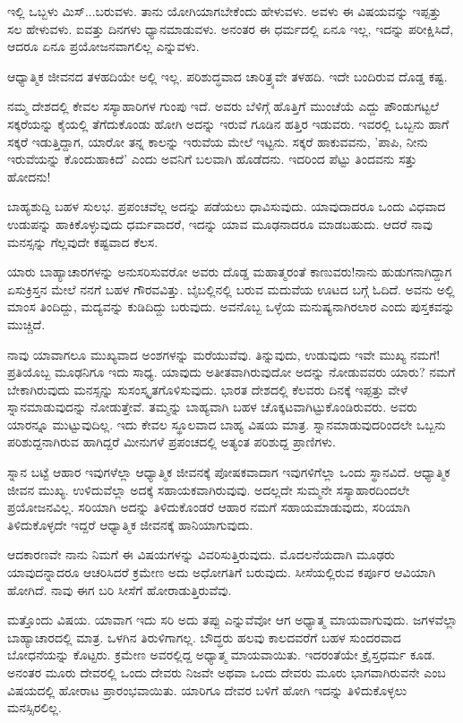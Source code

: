 ಇಲ್ಲಿ ಒಬ್ಬಳು ಮಿಸ್...ಬರುವಳು. ತಾನು ಯೋಗಿಯಾಗಬೇಕೆಂದು ಹೇಳುವಳು. ಅವಳು ಈ ವಿಷಯವನ್ನು ಇಪ್ಪತ್ತು ಸಲ ಹೇಳುವಳು. ಐವತ್ತು ದಿನಗಳು ಧ್ಯಾನಮಾಡುವಳು. ಅನಂತರ ಈ ಧರ್ಮದಲ್ಲಿ ಏನೂ ಇಲ್ಲ, ಇದನ್ನು ಪರೀಕ್ಷಿಸಿದೆ, ಆದರೂ ಏನೂ ಪ್ರಯೋಜನವಾಗಲಿಲ್ಲ ಎನ್ನುವಳು.

ಆಧ್ಯಾತ್ಮಿಕ ಜೀವನದ ತಳಹದಿಯೇ ಅಲ್ಲಿ ಇಲ್ಲ. ಪರಿಶುದ್ಧವಾದ ಚಾರಿತ್ರ್ಯವೇ ತಳಹದಿ. ಇದೇ ಬಂದಿರುವ ದೊಡ್ಡ ಕಷ್ಟ.

ನಮ್ಮ ದೇಶದಲ್ಲಿ ಕೇವಲ ಸಸ್ಯಾಹಾರಿಗಳ ಗುಂಪು ಇದೆ. ಅವರು ಬೆಳಿಗ್ಗೆ ಹೊತ್ತಿಗೆ ಮುಂಚೆಯೆ ಎದ್ದು ಪೌಂಡುಗಟ್ಟಲೆ ಸಕ್ಕರೆಯನ್ನು ಕೈಯಲ್ಲಿ ತೆಗೆದುಕೊಂಡು ಹೋಗಿ ಅದನ್ನು ಇರುವೆ ಗೂಡಿನ ಹತ್ತಿರ ಇಡುವರು. ಇವರಲ್ಲಿ ಒಬ್ಬನು ಹಾಗೆ ಸಕ್ಕರೆ ಇಡುತ್ತಿದ್ದಾಗ, ಯಾರೋ ತನ್ನ ಕಾಲನ್ನು ಇರುವೆಯ ಮೇಲೆ ಇಟ್ಟನು. ಸಕ್ಕರೆ ಹಾಕುವವನು, 'ಪಾಪಿ, ನೀನು ಇರುವೆಯನ್ನು ಕೊಂದುಹಾಕಿದೆ' ಎಂದು ಅವನಿಗೆ ಬಲವಾಗಿ ಹೊಡೆದನು. ಇದರಿಂದ ಪೆಟ್ಟು ತಿಂದವನು ಸತ್ತು ಹೋದನು!

ಬಾಹ್ಯಶುದ್ದಿ ಬಹಳ ಸುಲಭ. ಪ್ರಪಂಚವೆಲ್ಲ ಅದನ್ನು ಪಡೆಯಲು ಧಾವಿಸುವುದು. ಯಾವುದಾದರೂ ಒಂದು ವಿಧವಾದ ಉಡುಪನ್ನು ಹಾಕಿಕೊಳ್ಳುವುದು ಧರ್ಮವಾದರೆ, ಇದನ್ನು ಯಾವ ಮೂಢನಾದರೂ ಮಾಡಬಹುದು. ಆದರೆ ನಾವು ಮನಸ್ಸನ್ನು ಗೆಲ್ಲವುದೇ ಕಷ್ಟವಾದ ಕೆಲಸ.

ಯಾರು ಬಾಹ್ಯಾಚಾರಗಳನ್ನು ಅನುಸರಿಸುವರೋ ಅವರು ದೊಡ್ಡ ಮಹಾತ್ಮರಂತೆ ಕಾಣುವರು!ನಾನು ಹುಡುಗನಾಗಿದ್ದಾಗ ಏಸುಕ್ರಿಸ್ತನ ಮೇಲೆ ನನಗೆ ಬಹಳ ಗೌರವವಿತ್ತು. ಬೈಬಲ್ಲಿನಲ್ಲಿ ಬರುವ ಮದುವೆಯ ಊಟದ ಬಗ್ಗೆ ಓದಿದೆ. ಅವನು ಅಲ್ಲಿ ಮಾಂಸ ತಿಂದಿದ್ದು, ಮದ್ಯವನ್ನು ಕುಡಿದಿದ್ದು ಬರುವುದು. ಅವನೊಬ್ಬ ಒಳ್ಳೆಯ ಮನುಷ್ಯನಾಗಿರಲಾರ ಎಂದು ಪುಸ್ತಕವನ್ನು ಮುಚ್ಚಿದೆ.

ನಾವು ಯಾವಾಗಲೂ ಮುಖ್ಯವಾದ ಅಂಶಗಳನ್ನು ಮರೆಯುವೆವು. ತಿನ್ನುವುದು, ಉಡುವುದು ಇವೇ ಮುಖ್ಯ ನಮಗೆ! ಪ್ರತಿಯೊಬ್ಬ ಮೂಢನಿಗೂ ಇದು ಸಾಧ್ಯ. ಯಾವುದು ಅತೀತವಾಗಿರುವುದೋ ಅದನ್ನು ನೋಡುವವರು ಯಾರು? ನಮಗೆ ಬೇಕಾಗಿರುವುದು ಮನಸ್ಸನ್ನು ಸುಸಂಸ್ಕೃತಗೊಳಿಸುವುದು. ಭಾರತ ದೇಶದಲ್ಲಿ ಕೆಲವರು ದಿನಕ್ಕೆ ಇಪ್ಪತ್ತು ವೇಳೆ ಸ್ನಾನಮಾಡುವುದನ್ನು ನೋಡುತ್ತೇವೆ. ತಮ್ಮನ್ನು ಬಾಹ್ಯವಾಗಿ ಬಹಳ ಚೊಕ್ಕಟವಾಗಿಟ್ಟುಕೊಂಡಿರುವರು. ಅವರು ಯಾರನ್ನೂ ಮುಟ್ಟುವುದಿಲ್ಲ. ಇದು ಕೇವಲ ಸ್ಥೂಲವಾದ ಬಾಹ್ಯ ವಿಷಯ ಮಾತ್ರ. ಸ್ನಾನಮಾಡುವುದರಿಂದಲೇ ಒಬ್ಬನು ಪರಿಶುದ್ದನಾಗಿರುವ ಹಾಗಿದ್ದರೆ ಮೀನುಗಳೆ ಪ್ರಪಂಚದಲ್ಲಿ ಅತ್ಯಂತ ಪರಿಶುದ್ದ ಪ್ರಾಣಿಗಳು.

ಸ್ನಾನ ಬಟ್ಟೆ ಆಹಾರ ಇವುಗಳೆಲ್ಲಾ ಆಧ್ಯಾತ್ಮಿಕ ಜೀವನಕ್ಕೆ ಪೋಷಕವಾದಾಗ ಇವುಗಳಿಗೆಲ್ಲಾ ಒಂದು ಸ್ಥಾನವಿದೆ. ಆಧ್ಯಾತ್ಮಿಕ ಜೀವನ ಮುಖ್ಯ. ಉಳಿದುವೆಲ್ಲಾ ಅದಕ್ಕೆ ಸಹಾಯಕವಾಗಿರುವುವು. ಅದಲ್ಲದೇ ಸುಮ್ಮನೇ ಸಸ್ಯಾಹಾರದಿಂದಲೇ ಪ್ರಯೋಜನವಿಲ್ಲ. ಸರಿಯಾಗಿ ಅದನ್ನು ತಿಳಿದುಕೊಂಡರೆ ಆಹಾರ ನಮಗೆ ಸಹಾಯಮಾಡುವುದು, ಸರಿಯಾಗಿ ತಿಳಿದುಕೊಳ್ಳದೇ ಇದ್ದರೆ ಆಧ್ಯಾತ್ಮಿಕ ಜೀವನಕ್ಕೆ ಹಾನಿಯಾಗುವುದು.

ಆದಕಾರಣವೇ ನಾನು ನಿಮಗೆ ಈ ವಿಷಯಗಳನ್ನು ವಿವರಿಸುತ್ತಿರುವುದು. ಮೊದಲನೆಯದಾಗಿ ಮೂಢರು ಯಾವುದನ್ನಾದರೂ ಆಚರಿಸಿದರೆ ಕ್ರಮೇಣ ಅದು ಅಧೋಗತಿಗೆ ಬರುವುದು. ಸೀಸೆಯಲ್ಲಿರುವ ಕರ್ಪೂರ ಆವಿಯಾಗಿ ಹೋಗಿದೆ. ನಾವು ಈಗ ಬರಿ ಸೀಸೆಗೆ ಹೋರಾಡುತ್ತಿರುವೆವು.

ಮತ್ತೊಂದು ವಿಷಯ. ಯಾವಾಗ ಇದು ಸರಿ ಅದು ತಪ್ಪು ಎನ್ನುವೆವೋ ಆಗ ಅಧ್ಯಾತ್ಮ ಮಾಯವಾಗುವುದು. ಜಗಳವೆಲ್ಲಾ ಬಾಹ್ಯಾಚಾರದಲ್ಲಿ ಮಾತ್ರ. ಒಳಗಿನ ತಿರುಳಿಗಾಗಲ್ಲ. ಬೌದ್ಧರು ಹಲವು ಕಾಲದವರೆಗೆ ಬಹಳ ಸುಂದರವಾದ ಬೋಧನೆಯನ್ನು ಕೊಟ್ಟರು. ಕ್ರಮೇಣ ಅವರಲ್ಲಿದ್ದ ಅಧ್ಯಾತ್ಮ ಮಾಯವಾಯಿತು. ಇದರಂತೆಯೇ ಕ್ರೈಸ್ತಧರ್ಮ ಕೂಡ. ಅನಂತರ ಮೂರು ದೇವರಲ್ಲಿ ಒಂದು ದೇವರು ನಿಜವೇ ಅಥವಾ ಒಂದು ದೇವರು ಮೂರು ಭಾಗವಾಗಿರುವನೇ ಎಂಬ ವಿಷಯದಲ್ಲಿ ಹೋರಾಟ ಪ್ರಾರಂಭವಾಯಿತು. ಯಾರಿಗೂ ದೇವರ ಬಳಿಗೆ ಹೋಗಿ ಇದನ್ನು ತಿಳಿದುಕೊಳ್ಳಲು ಮನಸ್ಸಿರಲಿಲ್ಲ.

